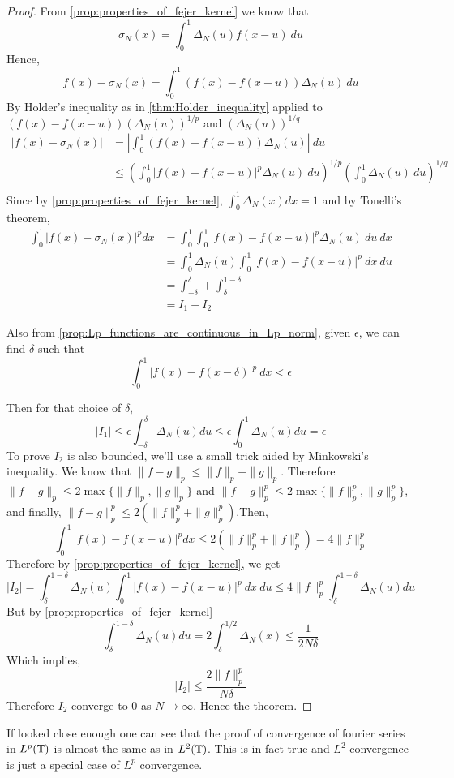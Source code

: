 \begin{proof}
  From \autoref{prop:properties_of_fejer_kernel} we know that
  \begin{displaymath}
    \sigma_N(x) = \int_0^1 \Delta_N(u)f(x-u) \ du 
  \end{displaymath}
  Hence,
  $$ f(x) - \sigma_N(x) = \int_0^1 (f(x) - f(x-u))\Delta_N(u) \ du $$ 
  By Holder's inequality as in \autoref{thm:Holder_inequality} applied to $(f(x) - f(x-u))(\Delta_N(u))^{1/p}$ and $(\Delta_N(u))^{1/q}$ 
  \begin{align*}
    |f(x) - \sigma_N(x)| &= \left| \int_0^1 (f(x) - f(x-u))\Delta_N(u) \right| \ du \\
          &\le \left( \int_0^1 |f(x) - f(x-u)|^{p} \Delta_N(u) \ du \right)^{1/p} \left( \int_0^1 \Delta_N(u) \ du \right)^{1/q} \\
  \end{align*}
  Since by \autoref{prop:properties_of_fejer_kernel}, $\int_0^1 \Delta_N(x) dx = 1$ and by Tonelli's theorem, 
  \begin{align*}
    \int_0^1 |f(x) - \sigma_N(x)|^p dx &= \int_0^1 \int_0^1 |f(x) - f(x-u)|^{p} \Delta_N(u) \ du  \ dx \\
          & = \int_0^1 \Delta_N(u) \int_0^1 |f(x) - f(x-u)|^{p} \ dx  \ du \\
          & = \int_{-\delta}^\delta + \int_\delta^{1-\delta} \\
          & = I_1 + I_2
  \end{align*}

  Also from \autoref{prop:Lp_functions_are_continuous_in_Lp_norm}, given $\epsilon$, we can find $\delta$ such that 
  $$ \int_0^1|f(x) - f(x-\delta)|^p \ dx < \epsilon$$

  Then for that choice of $\delta$,
  $$|I_1| \le \epsilon \int_{-\delta}^\delta \Delta_N(u) du \le \epsilon \int_0^1 \Delta_N(u) du = \epsilon$$
 To prove $I_2$ is also bounded, we'll use a small trick aided by Minkowski's inequality. We know that $\|f-g\|_p \le \|f\|_p + \|g\|_p$. Therefore $\|f-g\|_p \le 2\max\{\|f\|_p, \|g\|_p\}$ and $\|f-g\|_p^p \le 2\max\{\|f\|_p^p, \|g\|_p^p\}$, and finally, $\|f-g\|_p^p \le 2(\|f\|_p^p + \|g\|_p^p)$.Then, 
  $$ \int_0^1 |f(x) - f(x-u)|^p dx \le 2(\|f\|_p^p + \|f\|_p^p) = 4\|f\|_p^p$$
  Therefore by \autoref{prop:properties_of_fejer_kernel}, we get 
  $$|I_2| = \int_\delta^{1-\delta} \Delta_N(u) \int_0^1 |f(x) - f(x-u)|^{p} \ dx  \ du \le 4\|f\|_p^p \int_\delta^{1-\delta}\Delta_N(u) du$$
  But by \autoref{prop:properties_of_fejer_kernel} 
  $$ \int_\delta^{1-\delta}\Delta_N(u)du = 2\int_\delta^{1/2}\Delta_N(x) \le \frac{1}{2N\delta}$$
  Which implies, 
  $$ |I_2| \le \frac{2\|f\|_p^p}{N\delta}$$
  Therefore $I_2$ converge to $0$ as $N \to \infty$. Hence the theorem.
\end{proof}

If looked close enough one can see that the proof of convergence of fourier series in $L^p(\mathbb T)$ is almost the same as in $L^2(\mathbb T)$. This is in fact true and $L^2$ convergence is just a special case of $L^p$ convergence.
